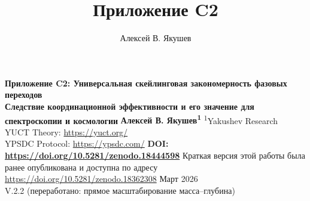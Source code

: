 \documentclass[12pt,a4paper]{article}
\title{Приложение C2}
\author{Алексей В. Якушев}
\theoremstyle{remark}
\begin{document}
	
	\begin{titlepage}
		\begin{center}
			\vspace*{1cm}
			\Huge\textbf{Приложение C2: Универсальная скейлинговая закономерность фазовых переходов} \\
			\vspace{0.5cm}
			\Large\textbf{Следствие координационной эффективности и его значение для спектроскопии и космологии}
			\vspace{1.5cm}
			\Large\textbf{Алексей В. Якушев\textsuperscript{1}}
			\vspace{0.3cm}
			\large
			\textsuperscript{1}Yakushev Research \\
			YUCT Theory: \url{https://yuct.org/} \\
			YPSDC Protocol: \url{https://ypsdc.com/}
			\vspace{2cm}
			\textbf{DOI: \url{https://doi.org/10.5281/zenodo.18444598}}
			\vspace{1cm}
			\large 
			Краткая версия этой работы была ранее опубликована и доступна по адресу \\
			\url{https://doi.org/10.5281/zenodo.18362308}
			\vspace{1cm}
			Март 2026 \\
			\large V.2.2 (переработано: прямое масштабирование масса–глубина)
			\vspace{2cm}
			\begin{minipage}{0.9\textwidth}
				\begin{abstract}
					\noindent

\end{abstract}
\end{minipage}
\end{center}
\end{titlepage}
\end{document}

